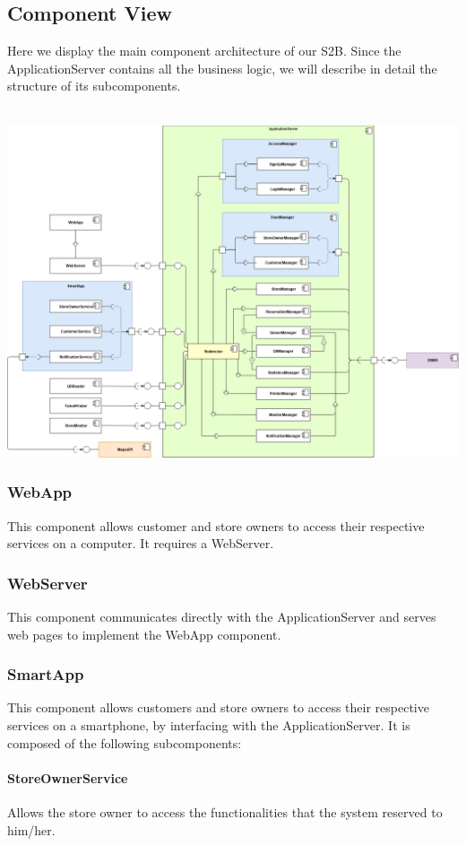 \subsection{Component View}
Here we display the main component architecture of our S2B. Since the ApplicationServer contains all the business logic, we will describe in detail the structure of its subcomponents.\\\\
\begin{flushleft}
\includegraphics[scale=0.3]{Images/Component.png}
\end{flushleft}
\subsubsection{WebApp}
This component allows customer and store owners to access their respective services on a computer. It requires a WebServer.
\subsubsection{WebServer}
This component communicates directly with the ApplicationServer and serves web pages to implement the WebApp component.
\subsubsection{SmartApp}
This component allows customers and store owners to access their respective services on a smartphone, by interfacing with the ApplicationServer. It is composed of the following subcomponents:
\paragraph{StoreOwnerService}Allows the store owner to access the functionalities that the system reserved to him/her.
